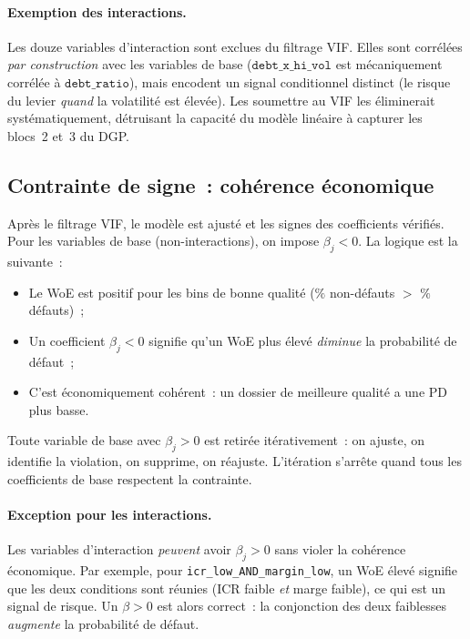 \documentclass[12pt, a4paper, twoside, openright]{report}
\theoremstyle{definition}
\begin{document}
\paragraph{Exemption des interactions.} Les douze variables d'interaction sont exclues du filtrage VIF. Elles sont corrélées \emph{par construction} avec les variables de base ($\texttt{debt\_x\_hi\_vol}$ est mécaniquement corrélée à $\texttt{debt\_ratio}$), mais encodent un signal conditionnel distinct (le risque du levier \emph{quand} la volatilité est élevée). Les soumettre au VIF les éliminerait systématiquement, détruisant la capacité du modèle linéaire à capturer les blocs~2 et~3 du DGP.

\subsection{Contrainte de signe~: cohérence économique}

Après le filtrage VIF, le modèle est ajusté et les signes des coefficients vérifiés. Pour les variables de base (non-interactions), on impose $\beta_j < 0$. La logique est la suivante~:
\begin{itemize}[nosep]
  \item Le WoE est positif pour les bins de bonne qualité ($\%$ non-défauts $>$ $\%$ défauts)~;
  \item Un coefficient $\beta_j < 0$ signifie qu'un WoE plus élevé \emph{diminue} la probabilité de défaut~;
  \item C'est économiquement cohérent~: un dossier de meilleure qualité a une PD plus basse.
\end{itemize}

Toute variable de base avec $\beta_j > 0$ est retirée itérativement~: on ajuste, on identifie la violation, on supprime, on réajuste. L'itération s'arrête quand tous les coefficients de base respectent la contrainte.

\paragraph{Exception pour les interactions.} Les variables d'interaction \emph{peuvent} avoir $\beta_j > 0$ sans violer la cohérence économique. Par exemple, pour \texttt{icr\_low\_AND\_margin\_low}, un WoE élevé signifie que les deux conditions sont réunies (ICR faible \emph{et} marge faible), ce qui est un signal de risque. Un $\beta > 0$ est alors correct~: la conjonction des deux faiblesses \emph{augmente} la probabilité de défaut.
\end{document}
